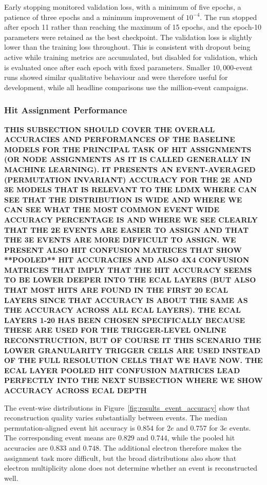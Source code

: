 Early stopping monitored validation loss, with a minimum of five epochs, a
patience of three epochs and a minimum improvement of \(10^{-4}\). The run
stopped after epoch 11 rather than reaching the maximum of 15 epochs, and the
epoch-10 parameters were retained as the best checkpoint. The validation loss
is slightly lower than the training loss throughout. This is consistent with
dropout being active while training metrics are accumulated, but disabled for
validation, which is evaluated once after each epoch with fixed parameters.
Smaller \(10{,}000\)-event runs showed similar qualitative behaviour and were
therefore useful for development, while all headline comparisons use the
million-event campaigns.




\subsubsection{Hit Assignment Performance}
\label{sec:results_detailed_hit_assignment}

\textbf{THIS SUBSECTION SHOULD COVER THE OVERALL ACCURACIES AND PERFORMANCES OF THE BASELINE MODELS FOR THE PRINCIPAL TASK OF HIT ASSIGNMENTS (OR NODE ASSIGNMENTS AS IT IS CALLED GENERALLY IN MACHINE LEARNING). IT PRESENTS AN EVENT-AVERAGED (PERMUTATION INVARIANT) ACCURACY FOR THE 2E AND 3E MODELS THAT IS RELEVANT TO THE LDMX WHERE CAN SEE THAT THE DISTRIBUTION IS WIDE AND WHERE WE CAN SEE WHAT THE MOST COMMON EVENT WIDE ACCURACY PERCENTAGE IS AND WHERE WE SEE CLEARLY THAT THE 2E EVENTS ARE EASIER TO ASSIGN AND THAT THE 3E EVENTS ARE MORE DIFFICULT TO ASSIGN. WE PRESENT ALSO HIT CONFUSION MATRICES THAT SHOW **POOLED** HIT ACCURACIES AND ALSO 4X4 CONFUSION MATRICES THAT IMPLY THAT THE HIT ACCURACY SEEMS TO BE LOWER DEEPER INTO THE ECAL LAYERS (BUT ALSO THAT MOST HITS ARE FOUND IN THE FIRST 20 ECAL LAYERS SINCE THAT ACCURACY IS ABOUT THE SAME AS THE ACCURACY ACROSS ALL ECAL LAYERS). THE ECAL LAYERS 1-20 HAS BEEN CHOSEN SPECIFICALLY BECAUSE THESE ARE USED FOR THE TRIGGER-LEVEL ONLINE RECONSTRUCTION, BUT OF COURSE IT THIS SCENARIO THE LOWER GRANULARITY TRIGGER CELLS ARE USED INSTEAD OF THE FULL RESOLUTION CELLS THAT WE HAVE NOW. THE ECAL LAYER POOLED HIT CONFUSION MATRICES LEAD PERFECTLY INTO THE NEXT SUBSECTION WHERE WE SHOW ACCURACY ACROSS ECAL DEPTH}

The event-wise distributions in Figure~\ref{fig:results_event_accuracy}
show that reconstruction quality varies substantially between events. The
median permutation-aligned event hit accuracy is \(0.854\) for \(2e\) and
\(0.757\) for \(3e\) events. The corresponding event means are \(0.829\) and
\(0.744\), while the pooled hit accuracies are \(0.833\) and \(0.748\).
The additional electron therefore makes the assignment task more difficult,
but the broad distributions also show that electron multiplicity alone does
not determine whether an event is reconstructed well.

